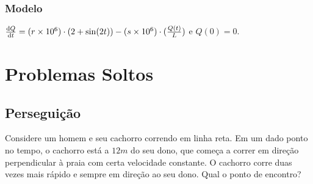 \documentclass[12pt]{article}
\begin{document}
\subsubsection{Modelo}

$\dv{Q}{t} = (r\times 10^6)\cdot (2 + \sin (2t)) - (s\times 10^6)\cdot
(\frac{Q(t)}{L})$ e $Q(0) = 0$. 

\section{Problemas Soltos}

\subsection{Perseguição}

Considere um homem e seu cachorro correndo em linha reta. Em um dado ponto no
tempo, o cachorro está a $12m$ do seu dono, que começa a correr em direção
perpendicular à praia com certa velocidade constante. O cachorro corre duas
vezes mais rápido e sempre em direção ao seu dono. Qual o ponto de encontro?
\end{document}
